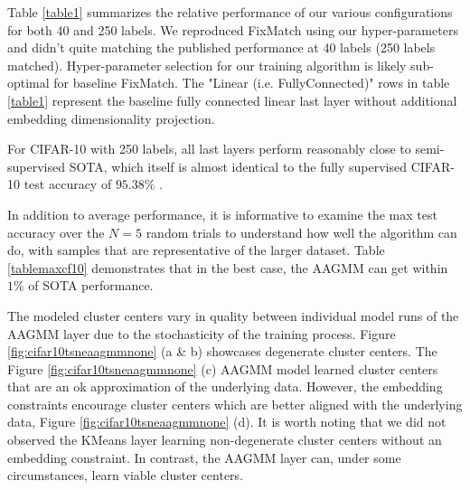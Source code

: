 \documentclass[10pt,twocolumn,letterpaper]{article}
\begin{document}
Table \ref{table1} summarizes the relative performance of our various configurations for both 40 and 250 labels.
We reproduced FixMatch \cite{sohn2020fixmatch} using our hyper-parameters and didn't quite matching the published performance at 40 labels (250 labels matched). 
Hyper-parameter selection for our training algorithm is likely sub-optimal for baseline FixMatch.
The "Linear (i.e. FullyConnected)" rows in table \ref{table1} represent the baseline fully connected linear last layer without additional embedding dimensionality projection.

For CIFAR-10 with 250 labels, all last layers perform reasonably close to semi-supervised SOTA, which itself is almost identical to the fully supervised CIFAR-10 test accuracy of $95.38\%$ \cite{wang2022freematch}. 

In addition to average performance, it is informative to examine the max test accuracy over the $N=5$ random trials to understand how well the algorithm can do, with samples that are representative of the larger dataset.
Table \ref{tablemaxcf10} demonstrates that in the best case, the AAGMM can get within $1\%$ of SOTA \cite{zheng2023simmatchv2} performance. 



The modeled cluster centers vary in quality between individual model runs of the AAGMM layer due to the stochasticity of the training process.
Figure \ref{fig:cifar10tsneaagmmnone} (a \& b) showcases degenerate cluster centers.
The Figure \ref{fig:cifar10tsneaagmmnone} (c) AAGMM model learned cluster centers that are an ok approximation of the underlying data.
However, the embedding constraints encourage cluster centers which are better aligned with the underlying data, Figure \ref{fig:cifar10tsneaagmmnone} (d).
It is worth noting that we did not observed the KMeans layer learning non-degenerate cluster centers without an embedding constraint.
In contrast, the AAGMM layer can, under some circumstances, learn viable cluster centers.
\end{document}
